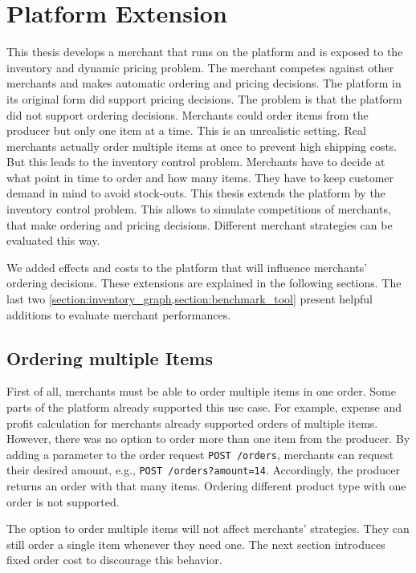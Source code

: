 
\chapter{\pricewars Platform Extension}

This thesis develops a merchant that runs on the \pricewars platform and is exposed to the inventory and dynamic pricing problem.
The merchant competes against other merchants and makes automatic ordering and pricing decisions.
The platform in its original form did support pricing decisions.
The problem is that the platform did not support ordering decisions.
Merchants could order items from the producer but only one item at a time.
This is an unrealistic setting.
Real merchants actually order multiple items at once to prevent high shipping costs.
But this leads to the inventory control problem.
Merchants have to decide at what point in time to order and how many items.
They have to keep customer demand in mind to avoid stock-outs.
This thesis extends the \pricewars platform by the inventory control problem.
This allows to simulate competitions of merchants, that make ordering and pricing decisions.
Different merchant strategies can be evaluated this way.

We added effects and costs to the platform that will influence merchants' ordering decisions.
These extensions are explained in the following sections.
The last two \cref{section:inventory_graph,section:benchmark_tool} present helpful additions to evaluate merchant performances.

\section{Ordering multiple Items}
\label{section:multiple_items}
First of all, merchants must be able to order multiple items in one order.
Some parts of the platform already supported this use case.
For example, expense and profit calculation for merchants already supported orders of multiple items.
However, there was no option to order more than one item from the producer.
By adding a parameter to the order request \texttt{POST /orders}, merchants can request their desired amount, e.g., \texttt{POST /orders?amount=14}.
Accordingly, the producer returns an order with that many items.
Ordering different product type with one order is not supported.

The option to order multiple items will not affect merchants' strategies.
They can still order a single item whenever they need one.
The next section introduces fixed order cost to discourage this behavior.

